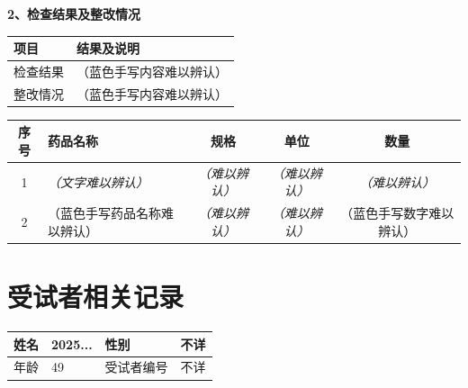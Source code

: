 \documentclass[UTF8,10pt,a4paper,fontset=fandol]{ctexart}
\newcommand{\fieldvalue}[1]{#1}
\newcommand{\handwritten}[1]{#1}
\begin{document}
\noindent
\textbf{2、检查结果及整改情况}

\begin{tabularx}{\textwidth}{|p{}|X|}
\hline
项目 & 结果及说明 \\
\hline
检查结果 &
\fieldvalue{\handwritten{（蓝色手写内容难以辨认）}} \\
\hline
整改情况 &
\fieldvalue{\handwritten{（蓝色手写内容难以辨认）}} \\
\hline
\end{tabularx}

\vspace{0.75em}

\begin{tabularx}{\textwidth}{|c|X|c|c|c|}
\hline
序号 & 药品名称 & 规格 & 单位 & 数量 \\
\hline
1 & \textit{（文字难以辨认）} & \textit{（难以辨认）} &
\textit{（难以辨认）} & \textit{（难以辨认）} \\
\hline
2 & 
\fieldvalue{\handwritten{（蓝色手写药品名称难以辨认）}} &
\textit{（难以辨认）} & \textit{（难以辨认）} &
\fieldvalue{\handwritten{（蓝色手写数字难以辨认）}} \\
\hline
\end{tabularx}


\newpage

\section*{受试者相关记录}

\begin{tabularx}{\textwidth}{|l|X|l|X|}
\hline
姓名 & 
\fieldvalue{\handwritten{2025...}} &
性别 & 
\fieldvalue{\handwritten{不详}} \\
\hline
年龄 & 
\fieldvalue{\handwritten{49}} &
受试者编号 & 
\fieldvalue{\handwritten{不详}} \\
\hline
\end{tabularx}
\end{document}
